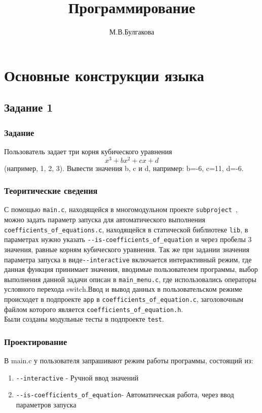 \documentclass[12pt,a4paper]{report}
\author{М.В.Булгакова}
\title{Программирование}
\begin{document}
\maketitle
\chapter{Основные конструкции языка}
\section{Задание 1}
\subsection{Задание}
Пользователь задает три корня кубического уравнения 
\begin{equation}
x^3+bx^2+cx+d 
\end{equation}
 (например, 1, 2, 3). Вывести значения b, c и d, например: b=-6, c=11, d=-6.
\subsection{Теоритические сведения}

С помощью \verb+main.c+, находящейся в многомодульном проекте \verb+subproject +, можно задать параметр запуска для автоматического выполнения\\ 
\verb+coefficients_of_equations.c+, находящейся в статической библиотеке \verb+lib+, в параметрах нужно указать 
\verb+--is-coefficients_of_equation+ и через пробелы 3 значения, равные корням кубического уравнения. Так же при задании значения параметра запуска в виде\verb+--interactive+ включается интерактивный режим, где данная функция принимает значения, вводимые пользователем программы, выбор выполнения данной задачи описан в \verb+main_menu.c+, где использовались операторы условного перехода switch.Ввод и вывод данных в пользовательском режиме происходет в подпроекте \verb+app+ в 
\verb+coefficients_of_equation.c+, заголовочным файлом которого является \verb+coefficients_of_equation.h+. \\ 
Были созданы модульные тесты в подпроекте \verb+test+. 

\subsection{Проектирование}
В main.c у пользователя запрашивают режим работы программы, состоящий из:
\begin{enumerate}
\item \verb+--interactive+ - Ручной ввод значений
\item \verb+--is-coefficients_of_equation+- Автоматическая работа, через ввод параметров запуска
\end{enumerate}
\end{document}
